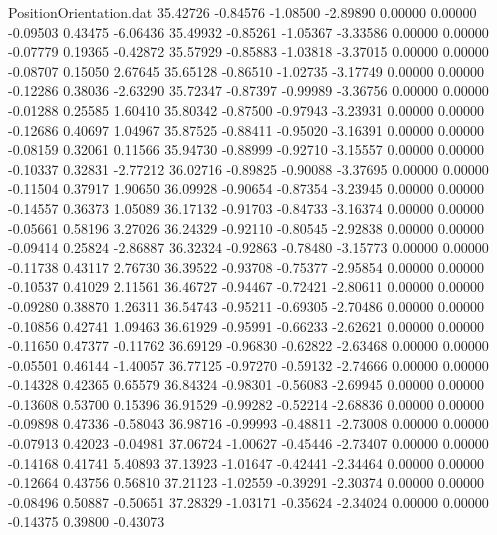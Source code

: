 \begin{filecontents}{PositionOrientation.dat}
  35.42726   -0.84576   -1.08500    -2.89890    0.00000    0.00000   -0.09503    0.43475   -6.06436
  35.49932   -0.85261   -1.05367    -3.33586    0.00000    0.00000   -0.07779    0.19365   -0.42872
  35.57929   -0.85883   -1.03818    -3.37015    0.00000    0.00000   -0.08707    0.15050    2.67645
  35.65128   -0.86510   -1.02735    -3.17749    0.00000    0.00000   -0.12286    0.38036   -2.63290
  35.72347   -0.87397   -0.99989    -3.36756    0.00000    0.00000   -0.01288    0.25585    1.60410
  35.80342   -0.87500   -0.97943    -3.23931    0.00000    0.00000   -0.12686    0.40697    1.04967
  35.87525   -0.88411   -0.95020    -3.16391    0.00000    0.00000   -0.08159    0.32061    0.11566
  35.94730   -0.88999   -0.92710    -3.15557    0.00000    0.00000   -0.10337    0.32831   -2.77212
  36.02716   -0.89825   -0.90088    -3.37695    0.00000    0.00000   -0.11504    0.37917    1.90650
  36.09928   -0.90654   -0.87354    -3.23945    0.00000    0.00000   -0.14557    0.36373    1.05089
  36.17132   -0.91703   -0.84733    -3.16374    0.00000    0.00000   -0.05661    0.58196    3.27026
  36.24329   -0.92110   -0.80545    -2.92838    0.00000    0.00000   -0.09414    0.25824   -2.86887
  36.32324   -0.92863   -0.78480    -3.15773    0.00000    0.00000   -0.11738    0.43117    2.76730
  36.39522   -0.93708   -0.75377    -2.95854    0.00000    0.00000   -0.10537    0.41029    2.11561
  36.46727   -0.94467   -0.72421    -2.80611    0.00000    0.00000   -0.09280    0.38870    1.26311
  36.54743   -0.95211   -0.69305    -2.70486    0.00000    0.00000   -0.10856    0.42741    1.09463
  36.61929   -0.95991   -0.66233    -2.62621    0.00000    0.00000   -0.11650    0.47377   -0.11762
  36.69129   -0.96830   -0.62822    -2.63468    0.00000    0.00000   -0.05501    0.46144   -1.40057
  36.77125   -0.97270   -0.59132    -2.74666    0.00000    0.00000   -0.14328    0.42365    0.65579
  36.84324   -0.98301   -0.56083    -2.69945    0.00000    0.00000   -0.13608    0.53700    0.15396
  36.91529   -0.99282   -0.52214    -2.68836    0.00000    0.00000   -0.09898    0.47336   -0.58043
  36.98716   -0.99993   -0.48811    -2.73008    0.00000    0.00000   -0.07913    0.42023   -0.04981
  37.06724   -1.00627   -0.45446    -2.73407    0.00000    0.00000   -0.14168    0.41741    5.40893
  37.13923   -1.01647   -0.42441    -2.34464    0.00000    0.00000   -0.12664    0.43756    0.56810
  37.21123   -1.02559   -0.39291    -2.30374    0.00000    0.00000   -0.08496    0.50887   -0.50651
  37.28329   -1.03171   -0.35624    -2.34024    0.00000    0.00000   -0.14375    0.39800   -0.43073

\end{filecontents}
